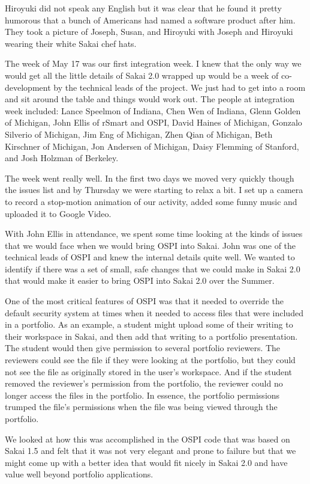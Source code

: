 \documentclass[12pt]{book}
\begin{document}
Hiroyuki did not speak any English but it was clear that
he found it pretty humorous that a bunch of Americans had
named a software product after him.
They took a picture of Joseph, Susan, and Hiroyuki with Joseph and
Hiroyuki wearing their white Sakai chef hats.

The week of May 17 was our first integration week.  I knew that
the only way we would get all the little details of Sakai 2.0
wrapped up would be a week of co-development by the technical
leads of the project.  We just had to get into a room and
sit around the table and things would work out.  The people
at integration week included: Lance Speelmon of Indiana,
Chen Wen of Indiana, Glenn Golden of Michigan,
John Ellis of rSmart and OSPI,
David Haines of Michigan,
Gonzalo Silverio of Michigan,
Jim Eng of Michigan,
Zhen Qian of Michigan,
Beth Kirschner of Michigan,
Jon Andersen of Michigan, Daisy Flemming of Stanford, and
Josh Holzman of Berkeley.

The week went really well.  In the first two days we moved very
quickly though the issues list and by Thursday we were starting
to relax a bit.  I set up a camera to record a stop-motion
animation of our activity, added some funny music and uploaded
it to Google Video.

With John Ellis in attendance, we spent some time looking at the
kinds of issues that we would face when we would bring OSPI
into Sakai.  John was one of the technical leads of OSPI and
knew the internal details quite well.  We wanted to identify
if there was a set of small, safe changes that we could make
in Sakai 2.0 that would make it easier to bring OSPI into Sakai
2.0 over the Summer.

One of the most critical features of OSPI was that it needed
to override the default security system at times when it needed
to access files that were included in a portfolio.  As an
example, a student might upload some of their writing to
their workspace in Sakai, and then add that writing to
a portfolio presentation.  The student would then give permission
to several portfolio reviewers.  The reviewers could see
the file if they were looking at the portfolio, but they
could not see the file as originally stored in the user's
workspace.  And if the student removed the reviewer's
permission from the portfolio, the reviewer could no longer
access the files in the portfolio.  In essence, the portfolio
permissions trumped the file's permissions when the
file was being viewed through the portfolio.

We looked at how this was accomplished in the OSPI code that
was based on Sakai 1.5 and felt that it was not very elegant
and prone to failure but that we might come up with a better
idea that would fit nicely in Sakai 2.0 and have value well
beyond portfolio applications.
\end{document}
